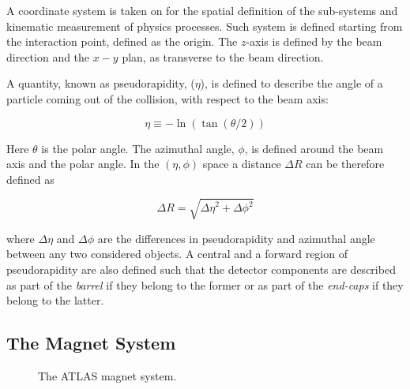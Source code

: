 			A coordinate system is taken on for the spatial definition of the sub-systems %
			and kinematic measurement of physics processes. Such system is defined starting from the interaction point, defined as the origin. The $z$-axis is defined by the beam direction and the $x-y$ plan, as transverse to the beam direction.

			A quantity, known as pseudorapidity, ($\eta$), is defined to describe the angle of a particle coming out of the collision, with respect to the beam axis: 

			\begin{equation*}
				\eta \equiv -\ln (\tan(\theta/2))
			\end{equation*}

			\noindent Here $\theta$ is the polar angle. The azimuthal angle, $\phi$, is defined around the beam axis and the polar angle. In the $(\eta,\phi)$ space a distance $\Delta R$ can be therefore defined as  
			
			\begin{equation*}
				\Delta R = \sqrt{{\Delta \eta}^2 + {\Delta \phi}^2}
			\end{equation*}

			\noindent where $\Delta \eta$ and $\Delta \phi$ are the differences in pseudorapidity and azimuthal angle between any two considered objects. A central and a forward region of pseudorapidity are also defined such that the detector components are described as part of the \emph{barrel} if they belong to the former or as part of the \emph{end-caps} if they belong to the latter. 



		\subsection{The Magnet System}
		\label{sec:magnet-system}
			
			\begin{figure}[!htb]
				\hfill
				\caption{The \ac{ATLAS} magnet system.}
			\end{figure}


